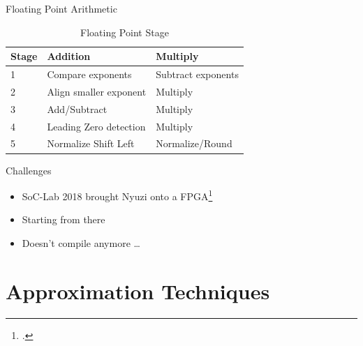 \documentclass{beamer}
\begin{document}
\begin{frame}{Floating Point Arithmetic}


\begin{table}[]
    \centering
    \begin{tabular}{l|l|l}
         Stage & Addition & Multiply \\ \hline \hline
         1 & Compare exponents & Subtract exponents \\
         2 & Align smaller exponent & Multiply\\
         3 & Add/Subtract & Multiply \\
         4 & Leading Zero detection & Multiply \\
         5 & Normalize Shift Left & Normalize/Round\\ \hline
    \end{tabular}
    \caption{Floating Point Stage}
    \label{tab:nyuzi_fpu}
\end{table}
    
\end{frame}

\begin{frame}{Challenges}
    \begin{itemize}
        \item<1-> SoC-Lab 2018 brought Nyuzi onto a FPGA\footcite{NyuziKessler}
        \item<2-> Starting from there
        \item<3-> Doesn't compile anymore \ldots
    \end{itemize}
\end{frame}

\section{Approximation Techniques}
\end{document}
